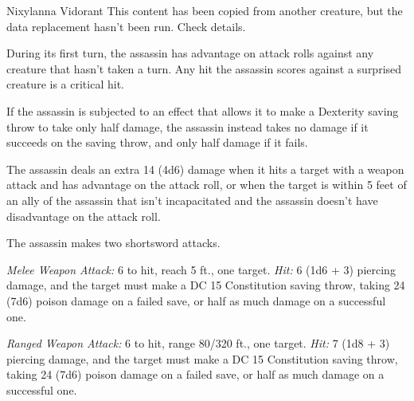 \documentclass[10pt,a4paper,twoside,bg=print,twocolumn,openany,nodeprecatedcode]{dndarticle}
\begin{document}
\begin{DndMonster}[float=t]{Nixylanna Vidorant}
\DndMonsterBasics[
armor-class = {15 (studded leather armor)},
hit-points = {\DndDice{12d8 + 24}},
speed = {30 ft.}
]
\DndMonsterAbilityScores[
 str = 11,
 dex = 16,
 con = 14,
 int = 13,
 wis = 11,
 cha = 10
]
\DndMonsterDetails[
saving-throws = {Dex +6, Int +4},
skills = {Acrobatics +6, Deception +3, Perception +3, Stealth +9},
damage-resistances = {poison},
languages = {Thieves' cant plus any two languages},
challenge = 8,
]
This content has been copied from another creature, but the data replacement hasn't been run. Check details.

During its first turn, the assassin has advantage on attack rolls against any creature that hasn't taken a turn. Any hit the assassin scores against a surprised creature is a critical hit.

If the assassin is subjected to an effect that allows it to make a Dexterity saving throw to take only half damage, the assassin instead takes no damage if it succeeds on the saving throw, and only half damage if it fails.

The assassin deals an extra 14 (4d6) damage when it hits a target with a weapon attack and has advantage on the attack roll, or when the target is within 5 feet of an ally of the assassin that isn't incapacitated and the assassin doesn't have disadvantage on the attack roll.

The assassin makes two shortsword attacks.

\textsl{Melee Weapon Attack:} 6 to hit, reach 5 ft., one target. \textsl{Hit:} 6 (1d6 + 3) piercing damage, and the target must make a DC 15 Constitution saving throw, taking 24 (7d6) poison damage on a failed save, or half as much damage on a successful one.

\textsl{Ranged Weapon Attack:} 6 to hit, range 80/320 ft., one target. \textsl{Hit:} 7 (1d8 + 3) piercing damage, and the target must make a DC 15 Constitution saving throw, taking 24 (7d6) poison damage on a failed save, or half as much damage on a successful one.

\end{DndMonster}
\end{document}
